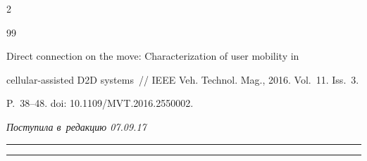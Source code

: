 \begin{multicols}{2}
{{\begin{thebibliography}{99}


 Direct connection on the move: Characterization of user mobility in 


cellular-assisted D2D systems~// IEEE Veh. Technol. Mag., 2016. Vol.~11. Iss.~3. 


P.~38--48. doi:  10.1109/MVT.2016.2550002.


 \end{thebibliography}





 }


 }





\end{multicols}





\vspace*{-3pt}





\hfill{\small\textit{Поступила в~редакцию 07.09.17}}





\vspace*{8pt}















\hrule





\vspace*{2pt}





\hrule













\def\tit{METHOD OF~MODELING INTERFERENCE CHARACTERISTICS 


IN~HETEROGENEOUS FIFTH GENERATION WIRELESS 


NETWORKS WITH~DEVICE-TO-DEVICE COMMUNICATIONS}





